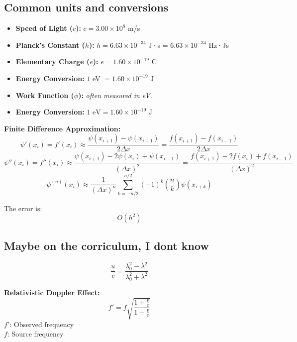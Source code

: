 \documentclass[a4paper,11pt]{article}
\renewcommand{\textbf}[1]{{\scriptsize	\bfseries #1}}
\begin{document}
\begin{footnotesize}
\begin{multicols}{2}
\begin{minipage}{\linewidth}
\section*{Common units and conversions}
\begin{itemize}
    \item \textbf{Speed of Light ($c$):} $c = 3.00 \times 10^8$ m/s
    \item \textbf{Planck's Constant ($h$):} $h = 6.63 \times 10^{-34}$ J·s = $6.63 \times 10^{-34}$ Hz·Js
    \item \textbf{Elementary Charge ($e$):} $e = 1.60 \times 10^{-19}$ C
    \item \textbf{Energy Conversion:} $1$ eV $= 1.60 \times 10^{-19}$ J
    \item \textbf{Work Function ($\phi$):} \textit{often measured in eV.}
    \item \textbf{Energy Conversion:} $1 \text{ eV} = 1.60 \times 10^{-19} \text{ J}$
\end{itemize}
\end{minipage}

\end{multicols}
\begin{minipage}{\linewidth}
\textbf{Finite Difference Approximation:}
\[
\psi'(x_i) = f'(x_i) \approx \frac{\psi(x_{i+1}) - \psi(x_{i-1})}{2\Delta x} = \frac{f(x_{i+1}) - f(x_{i-1})}{2\Delta x}
\]
\[
\psi''(x_i) = f''(x_i) \approx \frac{\psi(x_{i+1}) - 2\psi(x_i) + \psi(x_{i-1})}{(\Delta x)^2} = \frac{f(x_{i+1}) - 2f(x_i) + f(x_{i-1})}{(\Delta x)^2}
\]
\[
\psi^{(n)}(x_i) \approx \frac{1}{(\Delta x)^n} \sum_{k=-n/2}^{n/2} (-1)^k \binom{n}{k} \psi(x_{i+k})
\]


The error is: \[O(h^2)\]

\end{minipage}

\begin{multicols}{2}

\section*{Maybe on the corriculum, I dont know}
\begin{minipage}{\linewidth}

\[
\frac{u}{c} = \frac{\lambda_0^2 - \lambda^2}{\lambda_0^2 + \lambda^2}
\]

\textbf{Relativistic Doppler Effect:} \\[-0.2cm]
\[
f' = f \sqrt{\frac{1 + \frac{v}{c}}{1 - \frac{v}{c}}}
\]
\(f'\): Observed frequency \\
\(f\): Source frequency \\


\end{minipage}
\end{multicols}
\end{footnotesize}
\end{document}
